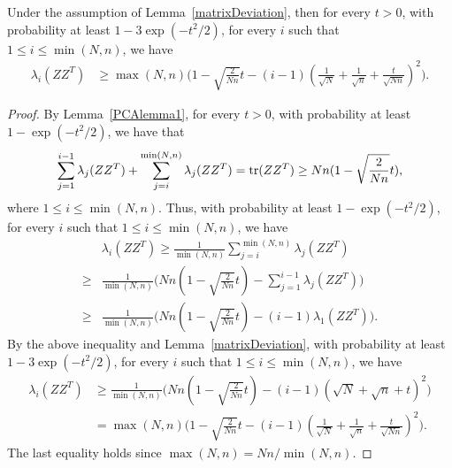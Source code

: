 \begin{lemma}\label{PCAlemma2}
    Under the assumption of Lemma~\ref{matrixDeviation}, then for every $t> 0$, with probability at least $1-3\exp(-t^2/2)$, for every $i$ such that $1\leq i \leq \min(N,n)$, we have
\begin{equation*}
    \begin{split}
        \lambda_{i}(ZZ^T)
        &\geq
        \max(N,n) \Big( 1-\sqrt{\frac{2}{Nn}}t-(i-1)(\frac{1}{\sqrt{N}}+\frac{1}{\sqrt{n}}+\frac{t}{\sqrt{Nn}})^2 \Big).
    \end{split}
\end{equation*}

\end{lemma}
\begin{proof}
    By Lemma~\ref{PCAlemma1}, for every $t>0$, with probability at least $1-\exp(-t^2/2)$, we have that
    $$
    \sum_{j=1}^{i-1}\lambda_j (ZZ^T) + \sum_{j=i}^{\min(N,n)}\lambda_j (ZZ^T)=\operatorname{tr} (ZZ^T)\geq Nn(1-\sqrt{\frac{2}{Nn}}t),
    $$
    where $1\leq i \leq \min(N,n)$.
    Thus, with probability at least $1-\exp(-t^2/2)$, for every $i$ such that $1\leq i \leq \min(N,n)$, we have
\begin{equation*}
    \begin{split}
        &\lambda_{i}(ZZ^T)\geq \frac{1}{\min(N,n)}\sum_{j=i}^{\min(N,n)}\lambda_j (ZZ^T)\\
        \geq &
        \frac{1}{\min(N,n)} \Big( Nn(1-\sqrt{\frac{2}{Nn}}t)-\sum_{j=1}^{i-1}\lambda_j (ZZ^T)  \Big)\\
        \geq &
        \frac{1}{\min(N,n)} \Big( Nn(1-\sqrt{\frac{2}{Nn}}t)-(i-1)\lambda_1 (ZZ^T)  \Big).
    \end{split}
\end{equation*}
    By the above inequality and Lemma~\ref{matrixDeviation}, with probability at least $1-3\exp(-t^2/2)$, for every $i$ such that $1\leq i \leq \min(N,n)$, we have
\begin{equation*}
    \begin{split}
        \lambda_{i}(ZZ^T)
        &\geq
        \frac{1}{\min(N,n)} \Big( Nn(1-\sqrt{\frac{2}{Nn}}t)-(i-1)(\sqrt{N}+\sqrt{n}+t)^2 \Big)\\
        &=
        \max(N,n) \Big( 1-\sqrt{\frac{2}{Nn}}t-(i-1)(\frac{1}{\sqrt{N}}+\frac{1}{\sqrt{n}}+\frac{t}{\sqrt{Nn}})^2 \Big).
    \end{split}
\end{equation*}
    The last equality holds since $\max(N,n)=Nn/\min(N,n)$.

\end{proof}

